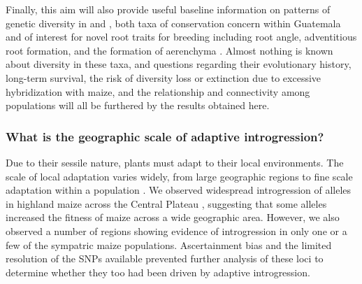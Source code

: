 Finally, this aim will also provide useful baseline information on patterns of genetic diversity in \zl{} and \zh, both taxa of conservation concern within Guatemala and of interest for novel root traits for breeding including root angle, adventitious root formation, and the formation of aerenchyma \citep{omori2007qtl,mano2007breeding}. 
Almost nothing is known about diversity in these taxa, and questions regarding their evolutionary history, long-term survival, the risk of diversity loss or extinction due to excessive hybridization with maize, and the relationship and connectivity among populations will all be furthered by the results obtained here.

\subsubsection{What is the geographic scale of adaptive introgression?}
\label{sss:scale}

Due to their sessile nature, plants must adapt to their local environments. 
The scale of local adaptation varies widely, from large geographic regions \citep{lowry2010, fang2014} to fine scale adaptation within a population \citep{hamrick1979}.  
We observed widespread introgression of \zm{} alleles in highland maize across the Central Plateau \citep{Hufford2013}, suggesting that some \zm{} alleles increased the fitness of maize across a wide geographic area.  
However, we also observed a number of regions showing evidence of introgression in only one or a few of the sympatric maize populations. 
Ascertainment bias and the limited resolution of the SNPs available prevented further analysis of these loci to determine whether they too had been driven by adaptive introgression.

